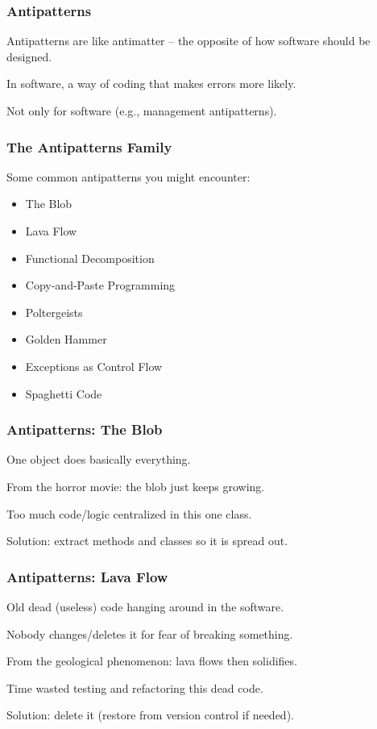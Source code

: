\begin{frame}
\frametitle{Antipatterns}
\begin{changemargin}{1cm}

Antipatterns are like antimatter -- the opposite of how software should be designed.

In software, a way of coding that makes errors more likely.

Not only for software (e.g., management antipatterns).

\end{changemargin}
\end{frame}

\begin{frame}
\frametitle{The Antipatterns Family}
\begin{changemargin}{1cm}

Some common antipatterns you might encounter:

\begin{itemize}
	\item The Blob
	\item Lava Flow
	\item Functional Decomposition
	\item Copy-and-Paste Programming
	\item Poltergeists
	\item Golden Hammer
	\item Exceptions as Control Flow
	\item Spaghetti Code
\end{itemize}


\end{changemargin}
\end{frame}


\begin{frame}
\frametitle{Antipatterns: The Blob}
\begin{changemargin}{1cm}
One object does basically everything.

From the horror movie: the blob just keeps growing.

Too much code/logic centralized in this one class.

Solution: extract methods and classes so it is spread out.


\end{changemargin}
\end{frame}

\begin{frame}
\frametitle{Antipatterns: Lava Flow}
\begin{changemargin}{1cm}
Old dead (useless) code hanging around in the software.

Nobody changes/deletes it for fear of breaking something.

From the geological phenomenon: lava flows then solidifies.

Time wasted testing and refactoring this dead code.

Solution: delete it (restore from version control if needed).

\end{changemargin}
\end{frame}

